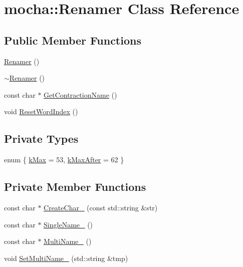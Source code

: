 \hypertarget{classmocha_1_1_renamer}{
\section{mocha::Renamer Class Reference}
\label{classmocha_1_1_renamer}
}
\subsection*{Public Member Functions}
\begin{DoxyCompactItemize}
\item 
\hyperlink{classmocha_1_1_renamer_a9af076ac282ed8215a33d1896c5664eb}{Renamer} ()
\item 
\hyperlink{classmocha_1_1_renamer_ac6564135f67efbb8c8a69865c66fa0f5}{$\sim$Renamer} ()
\item 
const char $\ast$ \hyperlink{classmocha_1_1_renamer_a0d7933492656fe6b5faf4767e93bd2a2}{GetContractionName} ()
\item 
void \hyperlink{classmocha_1_1_renamer_a162e6ffae6fa688a15f3b3087936bccd}{ResetWordIndex} ()
\end{DoxyCompactItemize}
\subsection*{Private Types}
\begin{DoxyCompactItemize}
\item 
enum \{ \hyperlink{classmocha_1_1_renamer_aacd096e25922be4974a7c0fa5d3c469dac7f3cb9d7ebc51797329d55d6a6125d7}{kMax} =  53, 
\hyperlink{classmocha_1_1_renamer_aacd096e25922be4974a7c0fa5d3c469daf9d96a405e3bcab9b646f2205b9b7e60}{kMaxAfter} =  62
 \}
\end{DoxyCompactItemize}
\subsection*{Private Member Functions}
\begin{DoxyCompactItemize}
\item 
const char $\ast$ \hyperlink{classmocha_1_1_renamer_a30895a99de0c47e4e8abc6f4b7231a96}{CreateChar\_\-} (const std::string \&str)
\item 
const char $\ast$ \hyperlink{classmocha_1_1_renamer_a198f1d21b4fc1501f20444fcf3b404e2}{SingleName\_\-} ()
\item 
const char $\ast$ \hyperlink{classmocha_1_1_renamer_a173e2716c252edede368847795dca3f3}{MultiName\_\-} ()
\item 
void \hyperlink{classmocha_1_1_renamer_a5d6ce4e565410a7360cc85c93ac1ee4d}{SetMultiName\_\-} (std::string \&tmp)
\end{DoxyCompactItemize}
